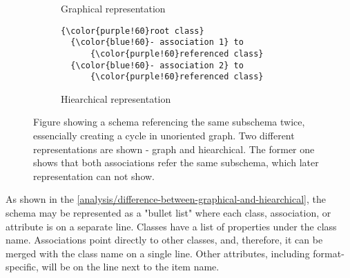 \begin{figure}[h!]\centering
  \begin{subfigure}{.5\textwidth}
      \centering
      \caption{Graphical representation}
    \end{subfigure}%
    \begin{subfigure}{.5\textwidth}
\begin{Verbatim}[commandchars=\\\{\}]
{\color{purple!60}root class}
  {\color{blue!60}- association 1} to
      {\color{purple!60}referenced class}
  {\color{blue!60}- association 2} to
      {\color{purple!60}referenced class}
\end{Verbatim}
      \caption{Hiearchical representation}
    \end{subfigure}

  \caption{Figure showing a schema referencing the same subschema twice, essencially creating a cycle in unoriented graph. Two different representations are shown - graph and hiearchical.  The former one shows that both associations refer the same subschema, which later representation can not show.}
  \label{analysis/difference-between-graphical-and-hiearchical}
\end{figure}

As shown in the \autoref{analysis/difference-between-graphical-and-hiearchical}, the schema may be represented as a "bullet list" where each class, association, or attribute is on a separate line. Classes have a list of properties under the class name. Associations point directly to other classes, and, therefore, it can be merged with the class name on a single line. Other attributes, including format-specific, will be on the line next to the item name.

